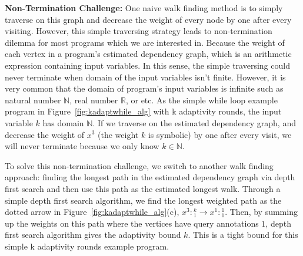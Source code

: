 \textbf{Non-Termination Challenge:}
One naive walk finding method is to simply traverse on this graph and decrease the weight of every node by one after every visiting. However, this simple 
traversing strategy leads to non-termination dilemma for most programs which we are interested in. 
Because the weight of each vertex in a program's estimated dependency graph,
which is an arithmetic expression containing input variables. 
In this sense, the simple traversing could never terminate when domain of the input variables isn't finite.
However, it is very common that the domain of program's input variables is infinite such as natural number $\mathbb{N}$, real number $\mathbb{R}$, or etc. As the simple while loop example program in Figure~\ref{fig:kadaptwhile_alg} with k adaptivity rounds, the input variable $k$ has domain $\mathbb{N}$.
%
If we traverse on the estimated dependency graph, and decrease the weight of $x^3$ (the weight $k$ is symbolic) by one after every visit,
we will never terminate because we only know $k \in \mathbb{N}$.



To solve this non-termination challenge, we switch to another walk finding approach:
finding the longest path in the estimated dependency graph via depth first search and then use this path as the estimated longest walk.
Through a simple depth first search algorithm, we find the longest weighted path as the dotted arrow in Figure~\ref{fig:kadaptwhile_alg}(c),
$x^3: {}^k_1 \to x^1: {}^1_1 $.
Then, by summing up the weights on this path where the vertices have query annotations $1$, depth first search algorithm gives the adaptivity bound $k$.
This is a tight bound for this simple k adaptivity rounds example program.

